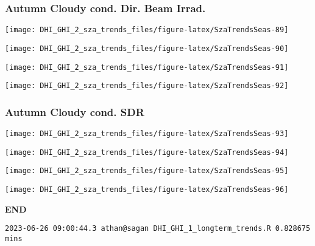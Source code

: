 \documentclass[
  10pt,
  a4paper,oneside]{article}
\begin{document}
\newpage

\hypertarget{autumn-cloudy-cond.-dir.-beam-irrad.}{%
\subsubsection{Autumn Cloudy cond. Dir. Beam Irrad.}\label{autumn-cloudy-cond.-dir.-beam-irrad.}}

\begin{center}\texttt{[image: DHI\_GHI\_2\_sza\_trends\_files/figure-latex/SzaTrendsSeas-89]} \end{center}

\begin{center}\texttt{[image: DHI\_GHI\_2\_sza\_trends\_files/figure-latex/SzaTrendsSeas-90]} \end{center}

\begin{center}\texttt{[image: DHI\_GHI\_2\_sza\_trends\_files/figure-latex/SzaTrendsSeas-91]} \end{center}

\begin{center}\texttt{[image: DHI\_GHI\_2\_sza\_trends\_files/figure-latex/SzaTrendsSeas-92]} \end{center}

\newpage

\hypertarget{autumn-cloudy-cond.-sdr}{%
\subsubsection{Autumn Cloudy cond. SDR}\label{autumn-cloudy-cond.-sdr}}

\begin{center}\texttt{[image: DHI\_GHI\_2\_sza\_trends\_files/figure-latex/SzaTrendsSeas-93]} \end{center}

\begin{center}\texttt{[image: DHI\_GHI\_2\_sza\_trends\_files/figure-latex/SzaTrendsSeas-94]} \end{center}

\begin{center}\texttt{[image: DHI\_GHI\_2\_sza\_trends\_files/figure-latex/SzaTrendsSeas-95]} \end{center}

\begin{center}\texttt{[image: DHI\_GHI\_2\_sza\_trends\_files/figure-latex/SzaTrendsSeas-96]} \end{center}

\textbf{END}

\begin{verbatim}
2023-06-26 09:00:44.3 athan@sagan DHI_GHI_1_longterm_trends.R 0.828675 mins
\end{verbatim}
\end{document}
